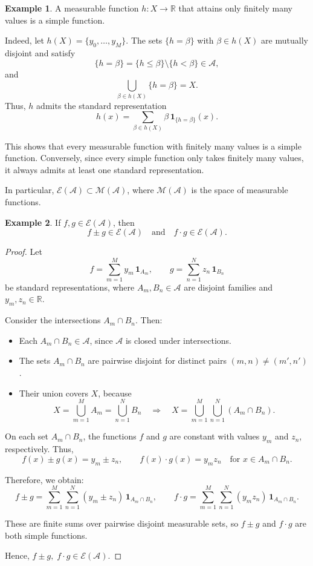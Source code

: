 \documentclass[12pt]{article}
\theoremstyle{definition}
\newtheorem{example}{Example}[section]
\begin{document}
\medskip
\begin{example}
A measurable function \( h : X \to \mathbb{R} \) that attains only finitely many values is a simple function.

Indeed, let \( h(X) = \{ y_0, \dots, y_M \} \). The sets \( \{ h = \beta \} \) with \( \beta \in h(X) \) are mutually disjoint and satisfy
\[
\{ h = \beta \} = \{ h \leq \beta \} \setminus \{ h < \beta \} \in \mathcal{A},
\]
and
\[
\bigcup_{\beta \in h(X)} \{ h = \beta \} = X.
\]
Thus, \( h \) admits the standard representation
\[
h(x) = \sum_{\beta \in h(X)} \beta \, \mathbf{1}_{\{ h = \beta \}}(x).
\]

This shows that every measurable function with finitely many values is a simple function. Conversely, since every simple function only takes finitely many values, it always admits at least one standard representation.

In particular, \( \mathcal{E}(\mathcal{A}) \subset \mathcal{M}(\mathcal{A}) \), where \( \mathcal{M}(\mathcal{A}) \) is the space of measurable functions.
\end{example}

\medskip
\begin{example}
If \( f, g \in \mathcal{E}(\mathcal{A}) \), then
\[
f \pm g \in \mathcal{E}(\mathcal{A}) \quad \text{and} \quad f \cdot g \in \mathcal{E}(\mathcal{A}).
\]
\end{example}

\begin{proof}
Let
\[
f = \sum_{m=1}^{M} y_m \, \mathbf{1}_{A_m}, \qquad
g = \sum_{n=1}^{N} z_n \, \mathbf{1}_{B_n}
\]
be standard representations, where \( A_m, B_n \in \mathcal{A} \) are disjoint families and \( y_m, z_n \in \mathbb{R} \).

Consider the intersections \( A_m \cap B_n \). Then:
\begin{itemize}
  \item Each \( A_m \cap B_n \in \mathcal{A} \), since \( \mathcal{A} \) is closed under intersections.
  \item The sets \( A_m \cap B_n \) are pairwise disjoint for distinct pairs \( (m, n) \neq (m', n') \).
  \item Their union covers \( X \), because
  \[
  X = \bigcup_{m=1}^{M} A_m = \bigcup_{n=1}^{N} B_n \quad \Rightarrow \quad X = \bigcup_{m=1}^{M} \bigcup_{n=1}^{N} (A_m \cap B_n).
  \]
\end{itemize}

On each set \( A_m \cap B_n \), the functions \( f \) and \( g \) are constant with values \( y_m \) and \( z_n \), respectively. Thus,
\[
f(x) \pm g(x) = y_m \pm z_n, \qquad f(x) \cdot g(x) = y_m z_n \quad \text{for } x \in A_m \cap B_n.
\]

Therefore, we obtain:
\[
f \pm g = \sum_{m=1}^{M} \sum_{n=1}^{N} (y_m \pm z_n) \, \mathbf{1}_{A_m \cap B_n}, \qquad
f \cdot g = \sum_{m=1}^{M} \sum_{n=1}^{N} (y_m z_n) \, \mathbf{1}_{A_m \cap B_n}.
\]

These are finite sums over pairwise disjoint measurable sets, so \( f \pm g \) and \( f \cdot g \) are both simple functions.

Hence, \( f \pm g, \; f \cdot g \in \mathcal{E}(\mathcal{A}) \).
\end{proof}
\end{document}
